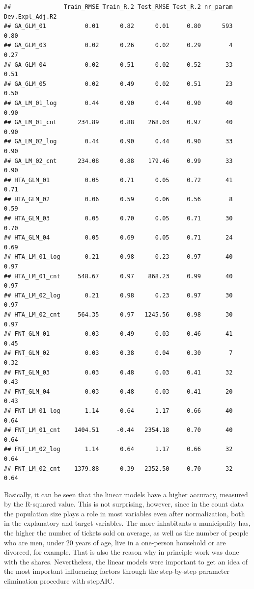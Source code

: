 \documentclass[
]{article}
\begin{document}
\begin{verbatim}
##               Train_RMSE Train_R.2 Test_RMSE Test_R.2 nr_param Dev.Expl_Adj.R2
## GA_GLM_01           0.01      0.82      0.01     0.80      593            0.80
## GA_GLM_03           0.02      0.26      0.02     0.29        4            0.27
## GA_GLM_04           0.02      0.51      0.02     0.52       33            0.51
## GA_GLM_05           0.02      0.49      0.02     0.51       23            0.50
## GA_LM_01_log        0.44      0.90      0.44     0.90       40            0.90
## GA_LM_01_cnt      234.89      0.88    268.03     0.97       40            0.90
## GA_LM_02_log        0.44      0.90      0.44     0.90       33            0.90
## GA_LM_02_cnt      234.08      0.88    179.46     0.99       33            0.90
## HTA_GLM_01          0.05      0.71      0.05     0.72       41            0.71
## HTA_GLM_02          0.06      0.59      0.06     0.56        8            0.59
## HTA_GLM_03          0.05      0.70      0.05     0.71       30            0.70
## HTA_GLM_04          0.05      0.69      0.05     0.71       24            0.69
## HTA_LM_01_log       0.21      0.98      0.23     0.97       40            0.97
## HTA_LM_01_cnt     548.67      0.97    868.23     0.99       40            0.97
## HTA_LM_02_log       0.21      0.98      0.23     0.97       30            0.97
## HTA_LM_02_cnt     564.35      0.97   1245.56     0.98       30            0.97
## FNT_GLM_01          0.03      0.49      0.03     0.46       41            0.45
## FNT_GLM_02          0.03      0.38      0.04     0.30        7            0.32
## FNT_GLM_03          0.03      0.48      0.03     0.41       32            0.43
## FNT_GLM_04          0.03      0.48      0.03     0.41       20            0.43
## FNT_LM_01_log       1.14      0.64      1.17     0.66       40            0.64
## FNT_LM_01_cnt    1404.51     -0.44   2354.18     0.70       40            0.64
## FNT_LM_02_log       1.14      0.64      1.17     0.66       32            0.64
## FNT_LM_02_cnt    1379.88     -0.39   2352.50     0.70       32            0.64
\end{verbatim}

Basically, it can be seen that the linear models have a higher accuracy,
measured by the R-squared value. This is not surprising, however, since
in the count data the population size plays a role in most variables
even after normalization, both in the explanatory and target variables.
The more inhabitants a municipality has, the higher the number of
tickets sold on average, as well as the number of people who are men,
under 20 years of age, live in a one-person household or are divorced,
for example. That is also the reason why in principle work was done with
the shares. Nevertheless, the linear models were important to get an
idea of the most important influencing factors through the step-by-step
parameter elimination procedure with stepAIC.
\end{document}
